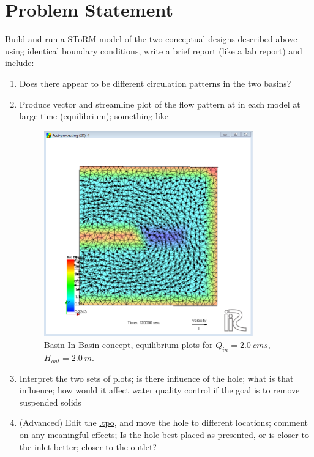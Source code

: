 \documentclass[12pt]{article}
\begin{document}
\section*{{Problem Statement}}
Build and run a SToRM model of the two conceptual designs described above using identical boundary conditions, write a brief report (like a lab report) and include:
\begin{enumerate}
\item Does there appear to be different circulation patterns in the two basins?
\item Produce vector and streamline plot of the flow pattern at in each model at large time (equilibrium); something like

\begin{figure}[h!] %
   \centering
   \includegraphics[height=3.5in]{TypicalVelocityField.png} 
   \caption{Basin-In-Basin concept, equilibrium plots for $Q_{in} = 2.0~cms$, $H_{out} = 2.0~m$.}
   \label{fig:TypicalVelocityField}
\end{figure}

\item Interpret the two sets of plots; is there influence of the hole; what is that influence; how would it affect water quality control if the goal is to remove suspended solids
\item (Advanced) Edit the \url{.tpo}, and move the hole to different locations; comment on any meaningful effects; Is the hole best placed as presented, or is closer to the inlet better; closer to the outlet?
\end{enumerate}
\end{document}

